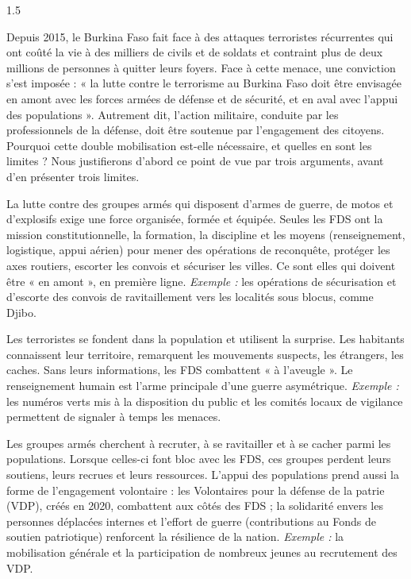 \documentclass[12pt]{article}
\begin{document}
\begin{spacing}{1.5}


Depuis 2015, le Burkina Faso fait face à des attaques terroristes récurrentes qui ont coûté la vie à des milliers de civils et de soldats et contraint plus de deux millions de personnes à quitter leurs foyers. Face à cette menace, une conviction s'est imposée : « la lutte contre le terrorisme au Burkina Faso doit être envisagée en amont avec les forces armées de défense et de sécurité, et en aval avec l'appui des populations ». Autrement dit, l'action militaire, conduite par les professionnels de la défense, doit être soutenue par l'engagement des citoyens. Pourquoi cette double mobilisation est-elle nécessaire, et quelles en sont les limites ? Nous justifierons d'abord ce point de vue par trois arguments, avant d'en présenter trois limites.


La lutte contre des groupes armés qui disposent d'armes de guerre, de motos et d'explosifs exige une force organisée, formée et équipée. Seules les FDS ont la mission constitutionnelle, la formation, la discipline et les moyens (renseignement, logistique, appui aérien) pour mener des opérations de reconquête, protéger les axes routiers, escorter les convois et sécuriser les villes. Ce sont elles qui doivent être « en amont », en première ligne. \emph{Exemple :} les opérations de sécurisation et d'escorte des convois de ravitaillement vers les localités sous blocus, comme Djibo.

Les terroristes se fondent dans la population et utilisent la surprise. Les habitants connaissent leur territoire, remarquent les mouvements suspects, les étrangers, les caches. Sans leurs informations, les FDS combattent « à l'aveugle ». Le renseignement humain est l'arme principale d'une guerre asymétrique. \emph{Exemple :} les numéros verts mis à la disposition du public et les comités locaux de vigilance permettent de signaler à temps les menaces.

Les groupes armés cherchent à recruter, à se ravitailler et à se cacher parmi les populations. Lorsque celles-ci font bloc avec les FDS, ces groupes perdent leurs soutiens, leurs recrues et leurs ressources. L'appui des populations prend aussi la forme de l'engagement volontaire : les Volontaires pour la défense de la patrie (VDP), créés en 2020, combattent aux côtés des FDS ; la solidarité envers les personnes déplacées internes et l'effort de guerre (contributions au Fonds de soutien patriotique) renforcent la résilience de la nation. \emph{Exemple :} la mobilisation générale et la participation de nombreux jeunes au recrutement des VDP.


\end{spacing}
\end{document}
